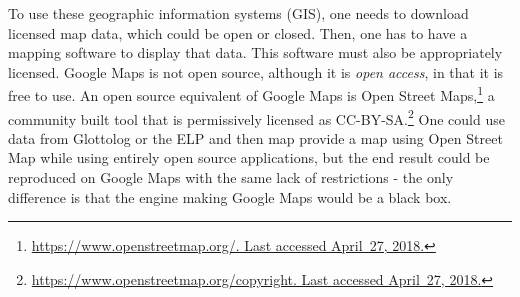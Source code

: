 To use these geographic information systems (GIS), one needs to download licensed map data, which could be open or closed. Then, one has to have a mapping software to display that data. This software must also be appropriately licensed. Google Maps is not open source, although it is {\it open access}, in that it is free to use. An open source equivalent of Google Maps is Open Street Maps,\footnote{\href{https://www.openstreetmap.org/}{https://www.openstreetmap.org/. Last accessed April~27, 2018.}} a community built tool that is permissively licensed as CC-BY-SA.\footnote{\href{https://www.openstreetmap.org/copyright}{https://www.openstreetmap.org/copyright. Last accessed April~27, 2018.}} One could use data from Glottolog or the ELP and then map provide a map using Open Street Map while using entirely open source applications, but the end result could be reproduced on Google Maps with the same lack of restrictions - the only difference is that the engine making Google Maps would be a black box.


